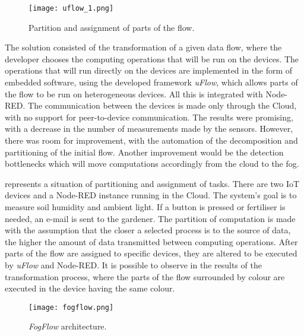 \begin{figure}[h]
\centering
\texttt{[image: uflow\_1.png]}
\caption[Partition and assignment of parts of the flow]{Partition and assignment of parts of the flow\cite{flow_based_programming_fog}.}\label{fig:uflow_1}
\end{figure}

The solution consisted of the transformation of a given data flow, where the developer chooses the computing operations that will be run on the devices. The operations that will run directly on the devices are implemented in the form of embedded software, using the developed framework \textit{uFlow}, which allows parts of the flow to be run on heterogeneous devices. All this is integrated with Node-RED. The communication between the devices is made only through the Cloud, with no support for peer-to-device communication. The results were promising, with a decrease in the number of measurements made by the sensors. However, there was room for improvement, with the automation of the decomposition and partitioning of the initial flow. Another improvement would be the detection bottlenecks which will move computations accordingly from the cloud to the fog.

 represents a situation of partitioning and assignment of tasks. There are two IoT devices and a Node-RED instance running in the Cloud. The system's goal is to measure soil humidity and ambient light. If a button is pressed or fertiliser is needed, an e-mail is sent to the gardener. The partition of computation is made with the assumption that the closer a selected process is to the source of data, the higher the amount of data transmitted between computing operations. After parts of the flow are assigned to specific devices, they are altered to be executed by \textit{uFlow} and Node-RED. It is possible to observe in  the results of the transformation process, where the parts of the flow surrounded by colour are executed in the device having the same colour.

\begin{figure}[h]
\centering
\texttt{[image: fogflow.png]}
\caption[\textit{FogFlow} architecture]{\textit{FogFlow} architecture\cite{fog_flow}.}\label{fig:fogflow}
\end{figure}
    
